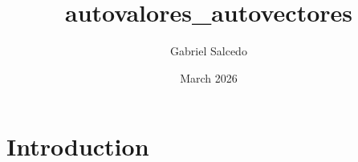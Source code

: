 \documentclass{article}
\title{autovalores_autovectores}
\author{Gabriel Salcedo}
\date{March 2026}
\begin{document}
\maketitle

\section{Introduction}
\end{document}
